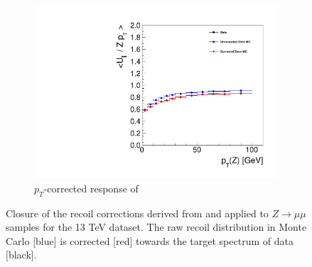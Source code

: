 \begin{figure}
\begin{subfigure}{.50\textwidth}
\includegraphics[width=\linewidth]{plots/Recoil/validation_13/response_par.pdf}
\caption{$p_T$-corrected response of \upar}
\end{subfigure}%
\caption{Closure of the recoil corrections derived from and applied to $Z\rightarrow\mu\mu$ samples for the 13 TeV dataset. The raw recoil distribution in Monte Carlo [blue] is corrected [red] towards the target spectrum of data [black].}
\label{fig:recoil:validation:13}
\end{figure}